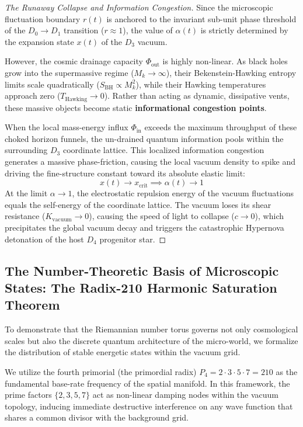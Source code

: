 \documentclass[11pt,a4paper]{article}
\theoremstyle{plain}
\theoremstyle{definition}
\theoremstyle{remark}
\begin{document}
\begin{proof}[The Runaway Collapse and Information Congestion]
Since the microscopic fluctuation boundary $r(t)$ is anchored to the invariant sub-unit phase threshold of the $D_0 \to D_1$ transition ($r \approx 1$), the value of $\alpha(t)$ is strictly determined by the expansion state $x(t)$ of the $D_3$ vacuum. 

However, the cosmic drainage capacity $\Phi_{\text{out}}$ is highly non-linear. As black holes grow into the supermassive regime ($M_k \to \infty$), their Bekenstein-Hawking entropy limits scale quadratically ($S_{\text{BH}} \propto M_k^2$), while their Hawking temperatures approach zero ($T_{\text{Hawking}} \to 0$). Rather than acting as dynamic, dissipative vents, these massive objects become static \textbf{informational congestion points}. 

When the local mass-energy influx $\Phi_{\text{in}}$ exceeds the maximum throughput of these choked horizon funnels, the un-drained quantum information pools within the surrounding $D_3$ coordinate lattice. This localized information congestion generates a massive phase-friction, causing the local vacuum density to spike and driving the fine-structure constant toward its absolute elastic limit:
\begin{equation}
x(t) \to x_{\text{crit}} \implies \alpha(t) \to 1
\end{equation}
At the limit $\alpha \to 1$, the electrostatic repulsion energy of the vacuum fluctuations equals the self-energy of the coordinate lattice. The vacuum loses its shear resistance ($K_{\text{vacuum}} \to 0$), causing the speed of light to collapse ($c \to 0$), which precipitates the global vacuum decay and triggers the catastrophic Hypernova detonation of the host $D_4$ progenitor star.
\end{proof}

\newpage
\subsection{The Number-Theoretic Basis of Microscopic States: The Radix-210 Harmonic Saturation Theorem}

To demonstrate that the Riemannian number torus governs not only cosmological scales but also the discrete quantum architecture of the micro-world, we formalize the distribution of stable energetic states within the vacuum grid. 

We utilize the fourth primorial (the primordial radix) $P_4 = 2 \cdot 3 \cdot 5 \cdot 7 = 210$ as the fundamental base-rate frequency of the spatial manifold. In this framework, the prime factors $\{2, 3, 5, 7\}$ act as non-linear damping nodes within the vacuum topology, inducing immediate destructive interference on any wave function that shares a common divisor with the background grid.
\end{document}
